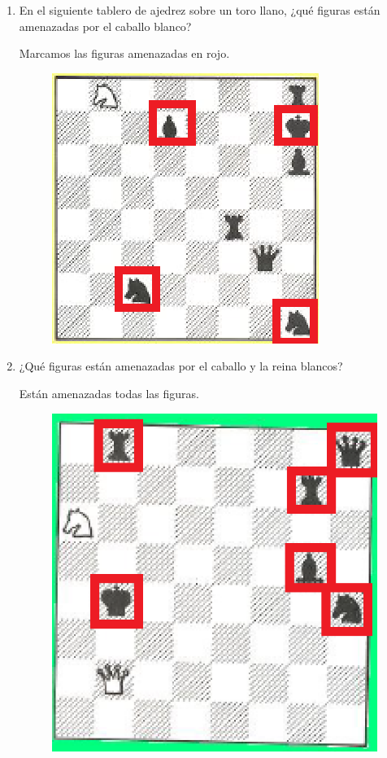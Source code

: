 \begin{enumerate}
\item En el siguiente tablero de ajedrez sobre un toro llano, ¿qué figuras están amenazadas por el caballo blanco?

Marcamos las figuras amenazadas en rojo.

\begin{figure}[H]
\centering
\includegraphics[scale=0.75]{images/universo/pagina_20_1_sol.png}
\end{figure}

\item ¿Qué figuras están amenazadas por el caballo y la reina blancos?

Están amenazadas todas las figuras.
\begin{figure}[H]
\centering
\includegraphics[scale=0.45]{images/universo/pagina_21_1_sol.png}
\end{figure}


\end{enumerate}
